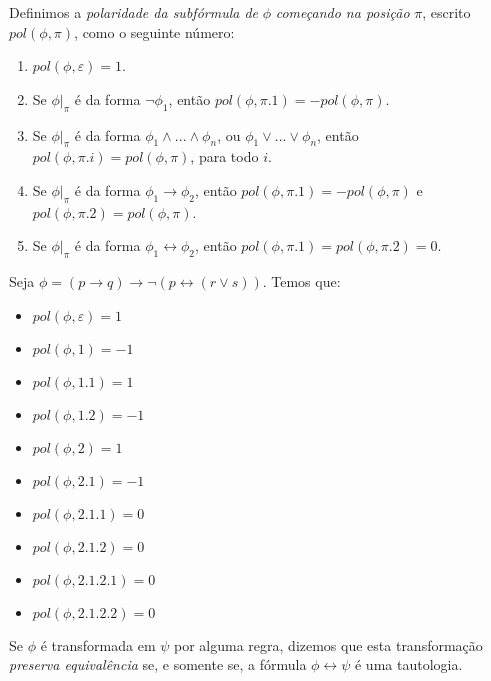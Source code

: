 \begin{definition}
    Definimos a \emph{polaridade da subfórmula de} $\phi$ \emph{começando na posição} $\pi$, escrito $pol(\phi,\pi)$, como o seguinte número:
    \begin{enumerate}
        \item $pol(\phi,\varepsilon) = 1$.
        \item Se $\phi|_\pi$ é da forma $\neg \phi_1$, então $pol(\phi,\pi.1) = -pol(\phi,\pi)$.
        \item Se $\phi|_\pi$ é da forma $\phi_1 \wedge ... \wedge \phi_n$, ou $\phi_1 \vee ... \vee \phi_n$, então $pol(\phi,\pi.i) = pol(\phi,\pi)$, para todo $i$.
        \item Se $\phi|_\pi$ é da forma $\phi_1 \rightarrow \phi_2$, então $pol(\phi,\pi.1) = -pol(\phi,\pi)$ e $pol(\phi,\pi.2) = pol(\phi,\pi)$.
        \item Se $\phi|_\pi$ é da forma $\phi_1 \leftrightarrow \phi_2$, então $pol(\phi,\pi.1) = pol(\phi,\pi.2) = 0$.
    \end{enumerate}
\end{definition}

\begin{example}
    Seja $\phi = (p \rightarrow q) \rightarrow \neg(p \leftrightarrow (r \vee s))$. Temos que:
    \begin{itemize}
        \item $pol(\phi,\varepsilon) = 1$
        \item $pol(\phi,1) = -1$
        \item $pol(\phi,1.1) = 1$
        \item $pol(\phi,1.2) = -1$
        \item $pol(\phi,2) = 1$
        \item $pol(\phi,2.1) = -1$
        \item $pol(\phi,2.1.1) = 0$
        \item $pol(\phi,2.1.2) = 0$
        \item $pol(\phi,2.1.2.1) = 0$
        \item $pol(\phi,2.1.2.2) = 0$
    \end{itemize}
\end{example}

\begin{definition}
	Se $\phi$ é transformada em $\psi$ por alguma regra, dizemos que esta transformação \emph{preserva equivalência} se, e somente se, a fórmula $\phi \leftrightarrow \psi$ é uma tautologia.
\end{definition}

